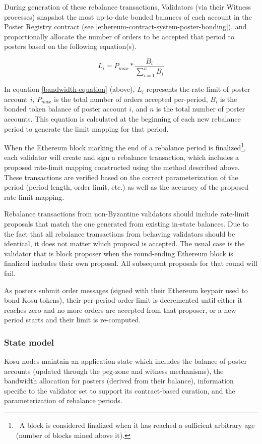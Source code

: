 \documentclass[10pt]{article}
\begin{document}
During generation of these rebalance transactions, Validators (via their Witness processes) snapshot the most up-to-date bonded balances of each account in the Poster Registry contract (see \ref{ethereum-contract-system-poster-bonding}), and proportionally allocate the number of orders to be accepted that period to posters based on the following equation(s).

\begin{equation}\label{bandwidth-equation}
  L_i =  P_{max} * \frac{B_i}{\sum_{i=1}^{n}B_i}
\end{equation}
\medskip

In equation \ref{bandwidth-equation} (above), $L_i$ represents the rate-limit of poster account $i$, $P_{max}$ is the total number of orders accepted per-period, $B_i$ is the bonded token balance of poster account $i$, and $n$ is the total number of poster accounts. This equation is calculated at the beginning of each new rebalance period to generate the limit mapping for that period.
\medskip 

When the Ethereum block marking the end of a rebalance period is finalized\footnote{\ A block is considered finalized when it has reached a sufficient arbitrary age (number of blocks mined above it).}, each validator will create and sign a rebalance transaction, which includes a proposed rate-limit mapping constructed using the method described above. These transactions are verified based on the correct parameterization of the period (period length, order limit, etc.) as well as the accuracy of the proposed rate-limit mapping. 
\medskip

Rebalance transactions from non-Byzantine validators should include rate-limit proposals that match the one generated from existing in-state balances. Due to the fact that all rebalance transactions from behaving validators should be identical, it does not matter which proposal is accepted. The usual case is the validator that is block proposer when the round-ending Ethereum block is finalized includes their own proposal. All subsequent proposals for that round will fail.
\medskip

As posters submit order messages (signed with their Ethereum keypair used to bond Kosu tokens), their per-period order limit is decremented until either it reaches zero and no more orders are accepted from that proposer, or a new period starts and their limit is re-computed.
\subsubsection{State model}\label{tm-network-state}
Kosu nodes maintain an application state which includes the balance of poster accounts (updated through the peg-zone and witness mechanisms), the bandwidth allocation for posters (derived from their balance), information specific to the validator set to support its contract-based curation, and the parameterization of rebalance periods.
\medskip
\end{document}
